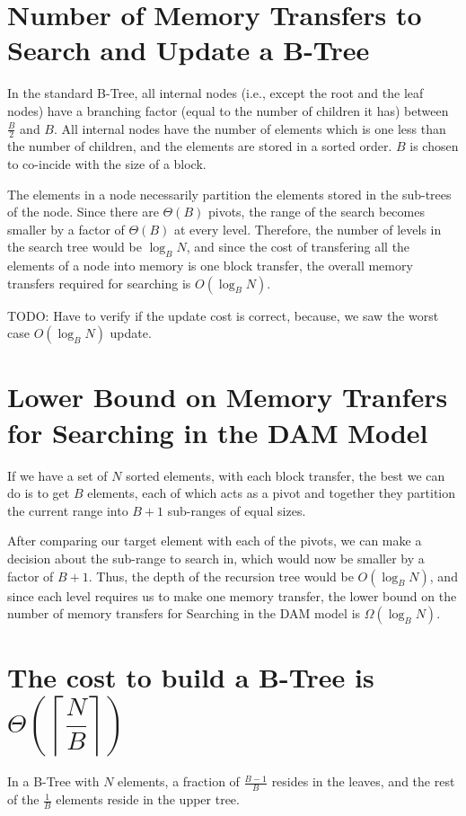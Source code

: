 \documentclass{article}
\begin{document}
\clearpage


\section {Number of Memory Transfers to Search and Update a B-Tree}
In the standard B-Tree, all internal nodes (i.e., except the root and
the leaf nodes) have a branching factor (equal to the number of
children it has) between $\frac{B}{2}$ and $B$. All internal nodes
have the number of elements which is one less than the number of
children, and the elements are stored in a sorted order. $B$ is chosen
to co-incide with the size of a block.

The elements in a node necessarily partition the elements stored in
the sub-trees of the node. Since there are $\Theta(B)$ pivots, the
range of the search becomes smaller by a factor of $\Theta(B)$ at
every level. Therefore, the number of levels in the search tree would
be $\log_B{N}$, and since the cost of transfering all the elements of
a node into memory is one block transfer, the overall memory transfers
required for searching is $O(\log_B{N})$.

TODO: Have to verify if the update cost is correct, because, we saw the worst
case $O(\log_B{N})$ update.

\clearpage 

\section {Lower Bound on Memory Tranfers for Searching in the DAM Model}
If we have a set of $N$ sorted elements, with each block transfer, the best we can
do is to get $B$ elements, each of which acts as a pivot and together they partition
the current range into $B+1$ sub-ranges of equal sizes. 

After comparing our target element with each of the pivots, we can make a decision
about the sub-range to search in, which would now be smaller by a factor of $B+1$.
Thus, the depth of the recursion tree would be $O(\log_B{N})$, and since each level
requires us to make one memory transfer, the lower bound on the number of memory
transfers for Searching in the DAM model is $\Omega(\log_B{N})$.

\clearpage

\section {The cost to build a B-Tree is $\Theta\left(\left\lceil\dfrac{N}{B}\right\rceil\right)$}
In a B-Tree with $N$ elements, a fraction of $\frac{B-1}{B}$ resides in the leaves, and
the rest of the $\frac{1}{B}$ elements reside in the upper tree. 
\end{document}

